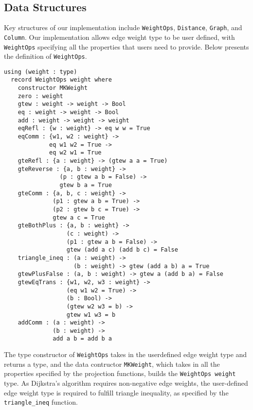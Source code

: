 
\subsection{Data Structures}
Key structures of our implementation include \texttt{WeightOps}, \texttt{Distance}, \texttt{Graph}, and \texttt{Column}. Our implementation allows edge weight type to be user defined, with \texttt{WeightOps} specifying all the properties that users need to provide. Below presents the definition of \texttt{WeightOps}. 
\newline
\begin{lstlisting}
using (weight : type)
  record WeightOps weight where
    constructor MKWeight
    zero : weight
    gtew : weight -> weight -> Bool
    eq : weight -> weight -> Bool
    add : weight -> weight -> weight
    eqRefl : {w : weight} -> eq w w = True
    eqComm : {w1, w2 : weight} -> 
    	     eq w1 w2 = True -> 
    	     eq w2 w1 = True
    gteRefl : {a : weight} -> (gtew a a = True)
    gteReverse : {a, b : weight} -> 
    			(p : gtew a b = False) -> 
    			gtew b a = True
    gteComm : {a, b, c : weight} ->
              (p1 : gtew a b = True) ->
              (p2 : gtew b c = True) ->
              gtew a c = True
    gteBothPlus : {a, b : weight} ->
                  (c : weight) ->
                  (p1 : gtew a b = False) ->
                  gtew (add a c) (add b c) = False
    triangle_ineq : (a : weight) -> 
    				(b : weight) -> gtew (add a b) a = True
    gtewPlusFalse : (a, b : weight) -> gtew a (add b a) = False
    gtewEqTrans : {w1, w2, w3 : weight} -> 
    			  (eq w1 w2 = True) -> 
    			  (b : Bool) -> 
    			  (gtew w2 w3 = b) -> 
    			  gtew w1 w3 = b
    addComm : (a : weight) -> 
    		  (b : weight) -> 
    		  add a b = add b a
\end{lstlisting}
The type constructor of \texttt{WeightOps} takes in the userdefined edge weight type and returns a type, and the data contructor \texttt{MKWeight}, which takes in all the properties specified by the projection functions, builds the \texttt{WeightOps weight} type. As Dijkstra's algorithm requires non-negative edge weights, the user-defined edge weight type is required to fulfill triangle inequality, as specified by the \texttt{triangle\_ineq} function. 
\\

